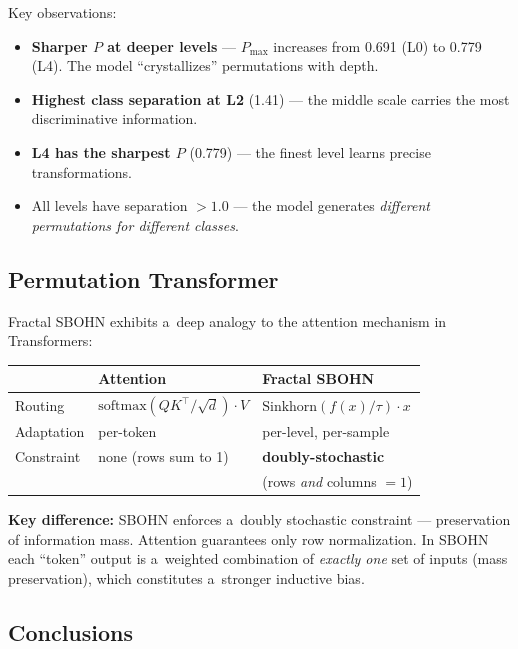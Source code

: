 \documentclass[11pt,a4paper]{report}
\begin{document}
Key observations:
\begin{itemize}
    \item \textbf{Sharper $P$ at deeper levels} --- $P_{\max}$ increases from 0.691 (L0) to 0.779 (L4). The model ``crystallizes'' permutations with depth.
    \item \textbf{Highest class separation at L2} (1.41) --- the middle scale carries the most discriminative information.
    \item \textbf{L4 has the sharpest $P$} (0.779) --- the finest level learns precise transformations.
    \item All levels have separation $>1.0$ --- the model generates \emph{different permutations for different classes}.
\end{itemize}


\subsection{Permutation Transformer}

Fractal SBOHN exhibits a~deep analogy to the attention mechanism in Transformers:

\begin{center}
\begin{tabular}{lll}
\hline
 & \textbf{Attention} & \textbf{Fractal SBOHN} \\
\hline
Routing & $\text{softmax}(QK^\top / \sqrt{d}) \cdot V$ & $\text{Sinkhorn}(f(x)/\tau) \cdot x$ \\
Adaptation & per-token & per-level, per-sample \\
Constraint & none (rows sum to 1) & \textbf{doubly-stochastic} \\
 & & (rows \emph{and} columns $= 1$) \\
\hline
\end{tabular}
\end{center}

\textbf{Key difference:} SBOHN enforces a~doubly stochastic constraint --- preservation of information mass. Attention guarantees only row normalization. In SBOHN each ``token'' output is a~weighted combination of \emph{exactly one} set of inputs (mass preservation), which constitutes a~stronger inductive bias.


\subsection{Conclusions}
\end{document}
